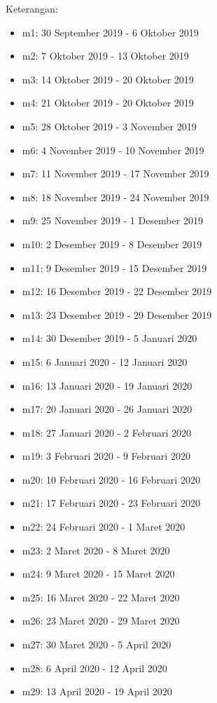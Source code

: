 Keterangan:
\begin{itemize}
    \item m1: 30 September 2019 - 6 Oktober 2019
    \item m2: 7 Oktober 2019 - 13 Oktober 2019
    \item m3: 14 Oktober 2019 - 20 Oktober 2019
    \item m4: 21 Oktober 2019 - 20 Oktober 2019
    \item m5: 28 Oktober 2019 - 3 November 2019
    \item m6: 4 November 2019 - 10 November 2019
    \item m7: 11 November 2019 - 17 November 2019
    \item m8: 18 November 2019 - 24 November 2019
    \item m9: 25 November 2019 - 1 Desember 2019
    \item m10: 2 Desember 2019 - 8 Desember 2019
    \item m11: 9 Desember 2019 - 15 Desember 2019
    \item m12: 16 Desember 2019 - 22 Desember 2019
    \item m13: 23 Desember 2019 - 29 Desember 2019
    \item m14: 30 Desember 2019 - 5 Januari 2020
    \item m15: 6 Januari 2020 - 12 Januari 2020
    \item m16: 13 Januari 2020 - 19 Januari 2020
    \item m17: 20 Januari 2020 - 26 Januari 2020
    \item m18: 27 Januari 2020 - 2 Februari 2020
    \item m19: 3 Februari 2020 - 9 Februari 2020
    \item m20: 10 Februari 2020 - 16 Februari 2020
    \item m21: 17 Februari 2020 - 23 Februari 2020
    \item m22: 24 Februari 2020 - 1 Maret 2020
    \item m23: 2 Maret 2020 - 8 Maret 2020
    \item m24: 9 Maret 2020 - 15 Maret 2020
    \item m25: 16 Maret 2020 - 22 Maret 2020
    \item m26: 23 Maret 2020 - 29 Maret 2020
    \item m27: 30 Maret 2020 - 5 April 2020
    \item m28: 6 April 2020 - 12 April 2020
    \item m29: 13 April 2020 - 19 April 2020

\end{itemize}
